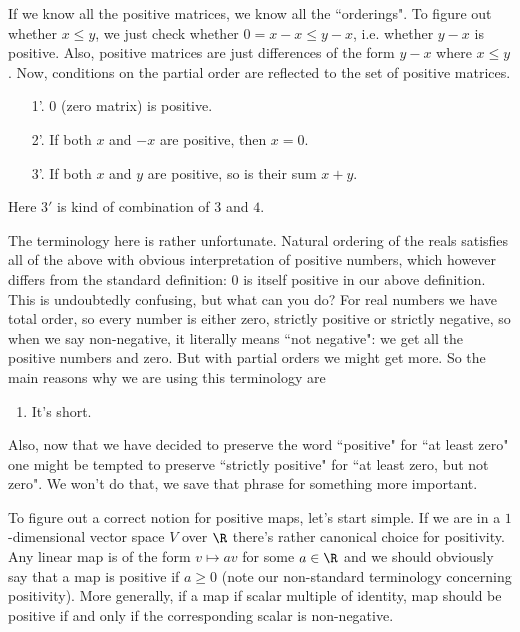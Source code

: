 If we know all the positive matrices, we know all the ``orderings". To figure out whether $x \leq y$, we just check whether $0 = x - x \leq y - x$, i.e. whether $y - x$ is positive. Also, positive matrices are just differences of the form $y - x$ where $x \leq y$. Now, conditions on the partial order are reflected to the set of positive matrices.
\begin{enumerate}
	\item[1'.] $0$ (zero matrix) is positive.
	\item[2'.] If both $x$ and $-x$ are positive, then $x = 0$.
	\item[3'.] If both $x$ and $y$ are positive, so is their sum $x + y$.
\end{enumerate}
Here $3'$ is kind of combination of $3$ and $4$.

The terminology here is rather unfortunate. Natural ordering of the reals satisfies all of the above with obvious interpretation of positive numbers, which however differs from the standard definition: $0$ is itself positive in our above definition. This is undoubtedly confusing, but what can you do? For real numbers we have total order, so every number is either zero, strictly positive or strictly negative, so when we say non-negative, it literally means ``not negative": we get all the positive numbers and zero. But with partial orders we might get more. So the main reasons why we are using this terminology are
\begin{enumerate}
	\item It's short.
\end{enumerate}
Also, now that we have decided to preserve the word ``positive" for ``at least zero" one might be tempted to preserve ``strictly positive" for ``at least zero, but not zero". We won't do that, we save that phrase for something more important.

To figure out a correct notion for positive maps, let's start simple. If we are in a $1$-dimensional vector space $V$ over $\R$ there's rather canonical choice for positivity. Any linear map is of the form $v \mapsto a v$ for some $a \in \R$ and we should obviously say that a map is positive if $a \geq 0$ (note our non-standard terminology concerning positivity). More generally, if a map if scalar multiple of identity, map should be positive if and only if the corresponding scalar is non-negative.

